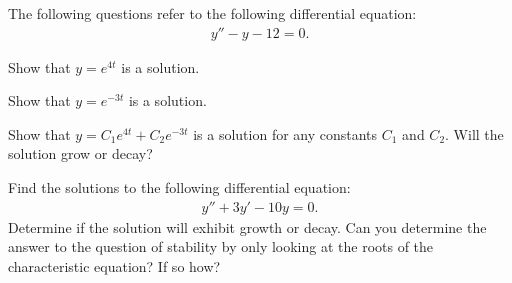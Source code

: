   \begin{problem}
  \item The following questions refer to the following differential
    equation:
    \begin{eqnarray*}
      y'' - y - 12 = 0.
    \end{eqnarray*}

    \begin{subproblem}
      \item Show that $y=e^{4t}$ is a solution.
        \vspace{4cm}
      \item Show that $y=e^{-3t}$ is a solution.
        \vspace{4cm}
      \item Show that $y=C_1 e^{4t} + C_2 e^{-3t}$ is a solution for
        any constants $C_1$ and $C_2$. Will the solution grow or
        decay?

        \vfill

    \end{subproblem}
 
    \clearpage
  \item Find the solutions to the following differential equation:
    \begin{eqnarray*}
      y'' + 3y' - 10y = 0.
    \end{eqnarray*}
    Determine if the solution will exhibit growth or decay. Can you
    determine the answer to the question of stability by only looking
    at the roots of the characteristic equation? If so how?

    \vfill
  \end{problem}


